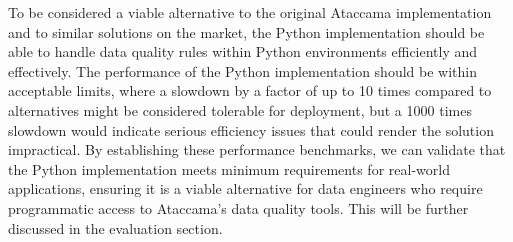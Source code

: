 To be considered a viable alternative to the original Ataccama implementation and to similar solutions on the market, the Python implementation should be able to handle data quality rules within Python environments efficiently and effectively. The performance of the Python implementation should be within acceptable limits, where a slowdown by a factor of up to 10 times compared to alternatives might be considered tolerable for deployment, but a 1000 times slowdown would indicate serious efficiency issues that could render the solution impractical. By establishing these performance benchmarks, we can validate that the Python implementation meets minimum requirements for real-world applications, ensuring it is a viable alternative for data engineers who require programmatic access to Ataccama's data quality tools. This will be further discussed in the evaluation section.